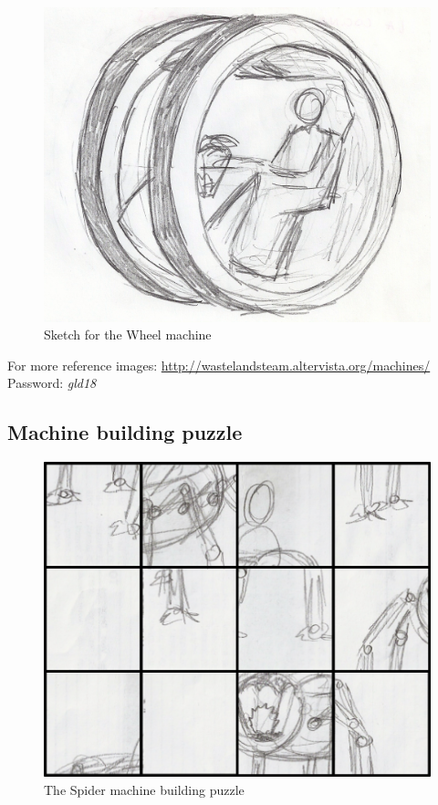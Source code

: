 \begin{figure}[H]
  \centering
  \includegraphics[width=14cm]{Images/Machines/wheel}
  \caption{Sketch for the Wheel machine}
\end{figure}

For more reference images: \url{http://wastelandsteam.altervista.org/machines/}\\
Password: \textit{gld18}

\subsection{Machine building puzzle}
\begin{figure}[H]
  \centering
  \includegraphics[width=\textwidth]{Images/Puzzles/machine}
  \caption{The Spider machine building puzzle}
\end{figure}

